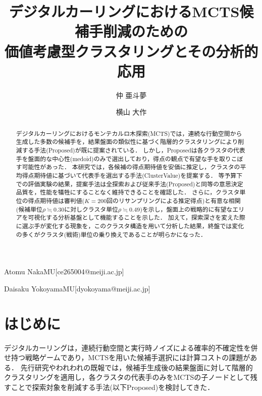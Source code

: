 \documentclass[submit,techrep,noauthor]{ipsj}
\newcommand{\rhoCluster}{0.49}
\newcommand{\rhoCandidate}{0.30}
\begin{document}
\title{デジタルカーリングにおけるMCTS候補手削減のための\\価値考慮型クラスタリングとその分析的応用}



\author{仲 亜斗夢}{Atomu Naka}{MU}[ce265004@meiji.ac.jp]
\author{横山 大作}{Daisaku Yokoyama}{MU}[dyokoyama@meiji.ac.jp]

\begin{abstract}
デジタルカーリングにおけるモンテカルロ木探索(MCTS)では，連続な行動空間から生成した多数の候補手を，結果盤面の類似性に基づく階層的クラスタリングにより削減する手法(Proposed)が既に提案されている．
しかし，Proposedは各クラスタの代表手を盤面的な中心性(medoid)のみで選出しており，得点の観点で有望な手を取りこぼす可能性があった．
本研究では，各候補の得点期待値を安価に推定し，クラスタの平均得点期待値に基づいて代表手を選出する手法(ClusterValue)を提案する．
等予算下での評価実験の結果，提案手法は全探索および従来手法(Proposed)と同等の意思決定品質を，性能を犠牲にすることなく維持できることを確認した．
さらに，クラスタ単位の得点期待値は審判値($K{=}200$回のリサンプリングによる推定得点)と有意な相関(候補単位$\rho\fallingdotseq\rhoCandidate$に対しクラスタ単位$\rho\fallingdotseq\rhoCluster$)を示し，盤面上の戦略的に有望なエリアを可視化する分析基盤として機能することを示した．
加えて，探索深さを変えた際に選ぶ手が変化する現象を，このクラスタ構造を用いて分析した結果，終盤では変化の多くがクラスタ(戦術)単位の乗り換えであることが明らかになった．
\end{abstract}

\maketitle

\section{はじめに}

デジタルカーリング\cite{dc3}は，連続行動空間と実行時ノイズによる確率的不確定性を併せ持つ戦略ゲームであり，MCTSを用いた候補手選択には計算コストの課題がある．
先行研究\cite{owatari2016,kato2016}やわれわれの既報\cite{naka_gi58}では，候補手生成後の結果盤面に対して階層的クラスタリングを適用し，各クラスタの代表手のみをMCTSの子ノードとして残すことで探索対象を削減する手法(以下Proposed)を検討してきた．
\end{document}
